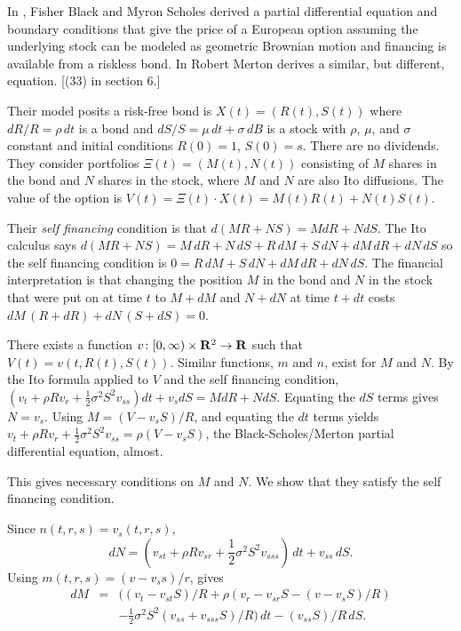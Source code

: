 \documentclass{article}
\newcommand{\R}{{\bf{R}}}
\newcommand{\onehalf}{\frac{1}{2}}
\begin{document}
In \cite{BlaSch1973}, Fisher Black and Myron Scholes derived a partial
differential equation and boundary conditions that give the 
price of a European option assuming the underlying stock can 
be modeled as geometric Brownian motion and financing is
available from a riskless bond. In \cite{Mer1973} Robert
Merton derives a similar, but different, equation. [(33) in
section 6.]

Their model posits a risk-free bond 
is $X(t) = (R(t), S(t))$ where $dR/R = \rho\,dt$ is a
bond and $dS/S = \mu\,dt + \sigma\,dB$ is a stock with $\rho$, $\mu$,
and $\sigma$ constant and initial conditions $R(0) = 1$, $S(0) = s$.
There are no dividends. They consider portfolios $\Xi(t) = (M(t), N(t))$
consisting of $M$ shares in the bond and $N$ shares in the stock, where
$M$ and $N$ are also Ito diffusions.  The value of the option is $V(t)
= \Xi(t)\cdot X(t) = M(t)R(t) + N(t)S(t)$.

Their {\em self financing} condition is that $d(MR + NS) = M dR + N dS$.
The Ito calculus says $d(MR + NS) = M\,dR + N\,dS + R\,dM + S\,dN + dM\,dR
+ dN\,dS$ so the self financing condition is $0 = R\,dM + S\,dN + dM\,dR +
dN\,dS$.  The financial interpretation is that changing the position $M$
in the bond and $N$ in the stock that were put on at time $t$ to $M +
dM$ and $N + dN$ at time $t + dt$ costs $dM\,(R + dR) + dN\,(S + dS) = 0$.

There exists a function $v\colon [0,\infty)\times\R^2\to\R$ such that
$V(t) = v(t, R(t), S(t))$. Similar functions, $m$ and $n$, exist for
$M$ and $N$.  By the Ito formula applied to $V$ and the self financing
condition, $(v_t + \rho R v_r + \onehalf \sigma^2 S^2 v_{ss}) dt + v_s
dS = M dR + N dS$.  Equating the $dS$ terms gives $N = v_s$. Using $M =
(V - v_s S)/R$, and equating the $dt$ terms yields $v_t + \rho R v_r +
\onehalf\sigma^2 S^2 v_{ss} = \rho(V - v_s S)$, the Black-Scholes/Merton
partial differential equation, almost.

This gives necessary conditions on $M$ and $N$. We show that
they satisfy the self financing condition.

Since $n(t, r, s) = v_s(t, r, s)$,
\begin{equation*}
dN = (v_{st} + \rho R v_{sr} + \onehalf \sigma^2 S^2 v_{sss})\,dt
	+ v_{ss}\,dS.
\end{equation*}
Using $m(t, r, s) = (v - v_s s)/r$, gives
\begin{eqnarray*}
dM &=& \bigl((v_t - v_{st}S)/R + \rho(v_r - v_{sr}S - (v - v_s S)/R)\\
 &&- \onehalf\sigma^2 S^2(v_{ss} + v_{sss}S)/R\bigr)\,dt - (v_{ss}S)/R\,dS.
\end{eqnarray*}
\end{document}
